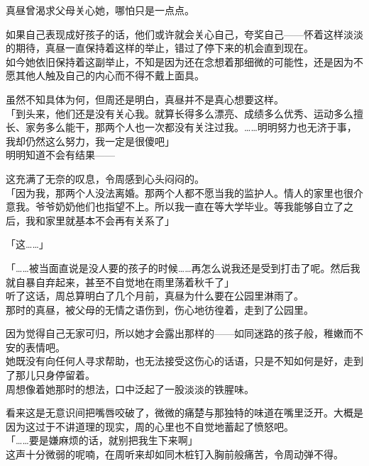 真昼曾渴求父母关心她，哪怕只是一点点。

如果自己表现成好孩子的话，他们或许就会关心自己，夸奖自己——怀着这样淡淡的期待，真昼一直保持着这样的举止，错过了停下来的机会直到现在。\\

如今她依旧保持着这副举止，不知是因为还在念想着那细微的可能性，还是因为不愿其他人触及自己的内心而不得不戴上面具。

虽然不知具体为何，但周还是明白，真昼并不是真心想要这样。\\

「到头来，他们还是没有关心我。就算长得多么漂亮、成绩多么优秀、运动多么擅长、家务多么能干，那两个人也一次都没有关注过我。……明明努力也无济于事，我却仍然这么努力，我一定是很傻吧」\\

明明知道不会有结果——

这充满了无奈的叹息，令周感到心头闷闷的。\\

「因为我，那两个人没法离婚。那两个人都不愿当我的监护人。情人的家里也很介意我。爷爷奶奶他们也指望不上。所以我一直在等大学毕业。等我能够自立了之后，我和家里就基本不会再有关系了」

「这……」

「……被当面直说是没人要的孩子的时候……再怎么说我还是受到打击了呢。然后我就自暴自弃起来，甚至不自觉地在雨里荡着秋千了」\\

听了这话，周总算明白了几个月前，真昼为什么要在公园里淋雨了。\\

那时的真昼，被父母的无情之语伤到，伤心地彷徨着，走到了公园里。

因为觉得自己无家可归，所以她才会露出那样的——如同迷路的孩子般，稚嫩而不安的表情吧。\\

她既没有向任何人寻求帮助，也无法接受这伤心的话语，只是不知如何是好，走到了那儿只身停留着。\\

周想像着她那时的想法，口中泛起了一股淡淡的铁腥味。

看来这是无意识间把嘴唇咬破了，微微的痛楚与那独特的味道在嘴里泛开。大概是因为这过于不讲道理的现实，周的心里也不自觉地蓄起了愤怒吧。\\

「……要是嫌麻烦的话，就别把我生下来啊」\\

这声十分微弱的呢喃，在周听来却如同木桩钉入胸前般痛苦，令周动弹不得。\\

